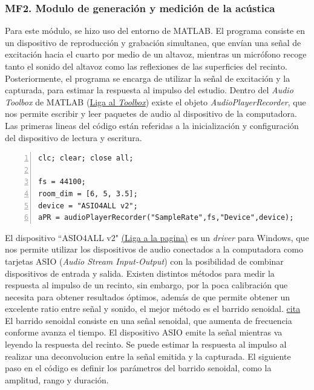 \subsubsection{MF2. Modulo de generación y medición de la acústica}

Para este módulo, se hizo uso del entorno de MATLAB. El programa consiste en un dispositivo de reproducción y grabación simultanea, que envían una señal de excitación hacia el cuarto por medio de un altavoz, mientras un micrófono recoge tanto el sonido del altavoz como las reflexiones de las superficies del recinto. Posteriormente, el programa se encarga de utilizar la señal de excitación y la capturada, para estimar la respuesta al impulso del estudio.\hfill \break
Dentro del \textit{Audio Toolbox} de MATLAB (\href{https://www.mathworks.com/products/audio.html}{Liga al \textit{Toolbox}}) existe  el objeto \textit{AudioPlayerRecorder}, que nos permite escribir y leer paquetes de audio al dispositivo de la computadora. \hfill \break
Las primeras lineas del código están referidas a la inicialización y configuración del dispositivo de lectura y escritura.\hfill \break
\begin{lstlisting}[frame=single,numbers=left, style=Matlab-editor, basicstyle=\tiny]
clc; clear; close all;

fs = 44100;
room_dim = [6, 5, 3.5];
device = "ASIO4ALL v2";
aPR = audioPlayerRecorder("SampleRate",fs,"Device",device);
\end{lstlisting}
El dispositivo ``ASIO4ALL v2" \href{https://asio4all.org/}{(Liga a la pagina)} es un \textit{driver} para Windows, que nos permite utilizar los dispositivos de audio conectados a la computadora como tarjetas ASIO (\textit{Audio Stream Input-Output}) con la posibilidad de combinar dispositivos de entrada y salida. \hfill\break
Existen distintos métodos para medir la respuesta al impulso de un recinto, sin embargo, por la poca calibración que necesita para obtener resultados óptimos, además de que permite obtener un excelente ratio entre señal y sonido, el mejor método es el barrido senoidal. \href{https://people.montefiore.uliege.be/stan/ArticleJAES.pdf}{cita} \hfill\break
El barrido senoidal consiste en una señal senoidal, que aumenta de frecuencia conforme avanza el tiempo. El dispositivo ASIO emite la señal mientras va leyendo la respuesta del recinto. Se puede estimar la respuesta al impulso al realizar una deconvolucion entre la señal emitida y la capturada. El siguiente paso en el código es definir los parámetros del barrido senoidal, como la amplitud, rango y duración.
